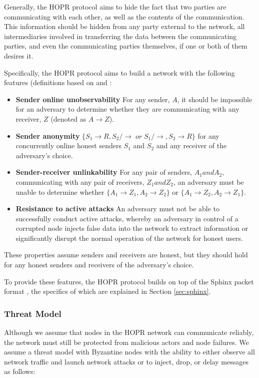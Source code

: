Generally, the HOPR protocol aims to hide the fact that two parties are communicating with each other, as well as the contents of the communication. This information should be hidden from any party external to the network, all intermediaries involved in transferring the data between the communicating parties, and even the communicating parties themselves, if one or both of them desires it.

Specifically, the HOPR protocol aims to build a network with the following features (definitions based on \cite{AnoA} and \cite{sphinxpaper}:

\begin{itemize}
    \item \textbf{Sender online unobservability}
        For any sender, $A$, it should be impossible for an adversary to determine whether they are communicating with any receiver, $Z$ (denoted as $A \rightarrow Z$).
    \item \textbf{Sender anonymity}
        $\{S_1 \rightarrow R,S_2 /\rightarrow \;or\; S_1 /\rightarrow,S_2 \rightarrow R\}$ for any concurrently online honest senders $S_1$ and $S_2$ and any receiver of the adversary’s choice.
    \item \textbf{Sender-receiver unlinkability}
    	For any pair of senders, $A_1 and A_2$, communicating with any pair of receivers, $Z_1 and Z_2$, an adversary must be unable to determine whether $\{A_1\rightarrow Z_1, A_2\rightarrow Z_2\}$ or $\{A_1\rightarrow Z_2, A_2\rightarrow Z_1\}$.
    \item \textbf{Resistance to active attacks}
          An adversary must not be able to successfully conduct active attacks, whereby an adversary in control of a corrupted node injects false data into the network to extract information or significantly disrupt the normal operation of the network for honest users.
\end{itemize}
These properties assume senders and receivers are honest, but they should hold for any honest senders and receivers of the adversary's choice.

To provide these features, the HOPR protocol builds on top of the Sphinx packet format \cite{sphinxpaper}, the specifics of which are explained in Section \ref{sec:sphinx}.

\subsubsection{Threat Model}

Although we assume that nodes in the HOPR network can communicate reliably, the network must still be protected from malicious actors and node failures. We assume a threat model with Byzantine nodes with the ability to either observe all network traffic and launch network attacks or to inject, drop, or delay messages as follows:

